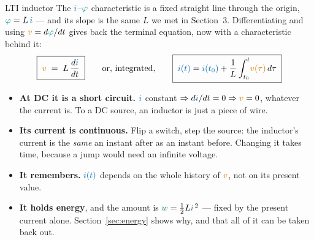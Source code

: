 \documentclass[11pt,a4paper]{article}
\newcommand{\Icol}[1]{\textcolor{ccur}{#1}}
\newcommand{\Vcol}[1]{\textcolor{cvolt}{#1}}
\newcommand{\Pcol}[1]{\textcolor{cpow}{#1}}
\newcommand{\Fcol}[1]{\textcolor{cflux}{#1}}
\begin{document}
\begin{definitionbox}{LTI inductor}
The $\Icol{i}$--$\Fcol{\varphi}$ characteristic is a fixed straight line through the
origin, $\Fcol{\varphi} = L\,\Icol{i}$ --- and its slope is the same $L$ we met in
Section~3. Differentiating and using $\Vcol{v} = d\Fcol{\varphi}/dt$ gives back the
terminal equation, now with a characteristic behind it:
\[
  \boxed{\;\Vcol{v} \;=\; L\,\frac{d\Icol{i}}{dt}\;}
  \qquad\text{or, integrated,}\qquad
  \boxed{\;\Icol{i(t)} = \Icol{i(t_0)} + \frac{1}{L}\int_{t_0}^{t}\!\Vcol{v(\tau)}\,d\tau\;}
\]
\end{definitionbox}

\begin{center}
\end{center}
\vspace{2pt}

\begin{ideabox}
\begin{itemize}
  \item \textbf{At DC it is a short circuit.} $\Icol{i}$ constant $\Rightarrow
        d\Icol{i}/dt = 0 \Rightarrow \Vcol{v} = 0$, whatever the current is. To a DC
        source, an inductor is just a piece of wire.
  \item \textbf{Its current is continuous.} Flip a switch, step the source: the
        inductor's current is the \emph{same} an instant after as an instant before.
        Changing it takes time, because a jump would need an infinite voltage.
  \item \textbf{It remembers.} $\Icol{i(t)}$ depends on the whole history of $\Vcol{v}$,
        not on its present value.
  \item \textbf{It holds energy}, and the amount is $\Pcol{w} = \tfrac12 L\Icol{i}^{\,2}$
        --- fixed by the present current alone. Section~\ref{sec:energy} shows why, and
        that all of it can be taken back out.
\end{itemize}
\end{ideabox}
\end{document}
